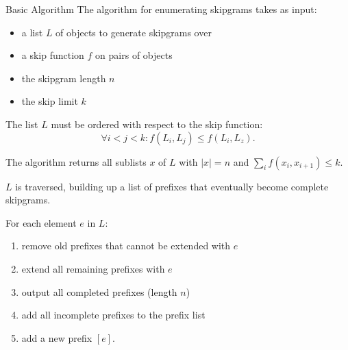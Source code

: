 \documentclass[final]{beamer}
\newcommand*{\pianoroll}{
  \draw (0,2) rectangle (1,2.4);
  \draw (1,2.4) rectangle (2,2.8);
  \draw (2,2) rectangle (2.5,2.4);
  \draw (2.5,1.6) rectangle (3,2);
  \draw (3,1.2) rectangle (3.5,1.6);
  \draw (3.5,0.8) rectangle (4,1.2);

  \draw (4,1.6) rectangle (5,2);
  \draw (5,2) rectangle (6,2.4);
  \draw (6,1.6) rectangle (6.5,2);
  \draw (6.5,1.2) rectangle (7,1.6);
  \draw (7,0.8) rectangle (7.5,1.2);
  \draw (7.5,0.4) rectangle (8,0.8);

  \draw (1,-0.4) rectangle (2,0);
  \draw (2,0) rectangle (4,0.4);
  \draw (5,-0.8) rectangle (6,-0.4);
  \draw (6,-0.4) rectangle (8,0);
}
\begin{document}
\begin{frame}[t]
\begin{minipage}[t][.56\textheight][t]{\textwidth}
\begin{columns}[t]
    \begin{column}{0.3\textwidth}
      \begin{block}{Basic Algorithm}
        The algorithm for enumerating skipgrams takes as input:

        \begin{itemize}
        \item a list $L$ of objects to generate skipgrams over
        \item a skip function $f$ on pairs of objects
        \item the skipgram length $n$
        \item the skip limit $k$
        \end{itemize}

        The list $L$ must be ordered with respect to the skip function:
        \[\forall i < j < k: f(L_i,L_j) \leq f(L_i,L_z).\]

        The algorithm returns all sublists $x$ of $L$ with $|x| = n$ and
        $\sum_i f(x_i,x_{i+1}) \leq k$.

        $L$ is traversed, building up a \alert{list of prefixes}
        that eventually become complete skipgrams.

        For each element $e$ in $L$:
        \begin{enumerate}
        \item remove old prefixes that cannot be extended with $e$
        \item extend all remaining prefixes with $e$%
          \item output all completed prefixes (length $n$)
          \item add all incomplete prefixes to the prefix list
        \item add a new prefix $[e]$.
        \end{enumerate}

        \begin{adjustbox}{scale=2,center,margin=0 1ex}
\end{adjustbox}
\end{block}
\end{column}
\end{columns}
\end{minipage}
\end{frame}
\end{document}
